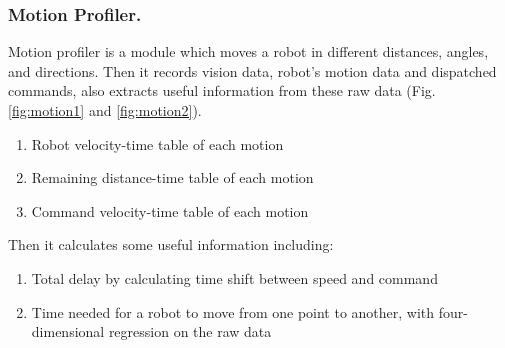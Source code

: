 \documentclass{llncs}
\begin{document}
\subsubsection{Motion Profiler.}
\label{subsubsec:MotionProfiler}
Motion profiler is a module which moves a robot in different distances, angles, and directions. Then it records vision data, robot’s motion data and dispatched commands, also extracts useful information from these raw data (Fig. \ref{fig:motion1} and \ref{fig:motion2}).
\begin{enumerate}  
\item Robot velocity-time table of each motion
\item Remaining distance-time table of each motion
\item Command velocity-time table of each motion
\end{enumerate}
Then it calculates some useful information including:
\begin{enumerate}  
\item Total delay by calculating time shift between speed and command 
\item Time needed for a robot to move from one point to another, with four-dimensional regression on the raw data
\end{enumerate}
\end{document}
